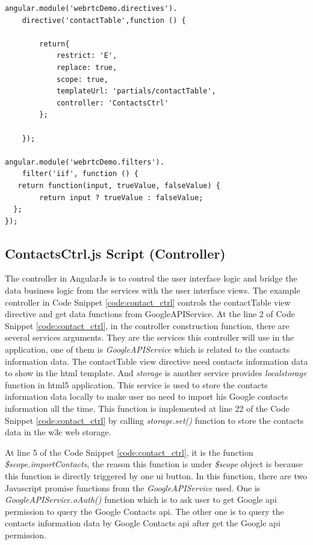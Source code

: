 \begin{lstlisting}[caption={ContactTableDirective.js in application client},label={code:contact_table_dir}]
angular.module('webrtcDemo.directives').
	directive('contactTable',function () {

		return{
			restrict: 'E',
			replace: true,
			scope: true,
			templateUrl: 'partials/contactTable',
			controller: 'ContactsCtrl'
		};

	});

angular.module('webrtcDemo.filters').
	filter('iif', function () {
   return function(input, trueValue, falseValue) {
        return input ? trueValue : falseValue;
  };
});
\end{lstlisting}

\subsection{ContactsCtrl.js Script (Controller)}

\par The controller in AngularJs is to control the user interface logic and bridge the data business logic from the services with the user interface views. The example controller in Code Snippet \ref{code:contact_ctrl} controls the contactTable view directive and get data functions from GoogleAPIService. At the line 2 of Code Snippet \ref{code:contact_ctrl}, in the controller construction function, there are several services arguments. They are the services this controller will use in the application, one of them is \textit{GoogleAPIService} which is related to the contacts information data. The contactTable view directive need contacts information data to show in the \gls{html} template. And \textit{storage} is another service provides \textit{localstorage} function in \gls{html5} application. This service is used to store the contacts information data locally to make user no need to import his Google contacts information all the time. This function is implemented at line 22 of the Code Snippet \ref{code:contact_ctrl} by calling \textit{storage.set()} function to store the contacts data in the \gls{w3c} web storage.

\par At line 5 of the Code Snippet \ref{code:contact_ctrl}, it is the function \textit{\$scope.importContacts}, the reason this function is under \textit{\$scope} object is because this function is directly triggered by one \gls{ui} button. In this function, there are two Javascript promise functions from the \textit{GoogleAPIService} used. One is \textit{GoogleAPIService.oAuth()} function which is to ask user to get Google \gls{api} permission to query the Google Contacts \gls{api}. The other one is  to query the contacts information data by Google Contacts \gls{api} after get the Google \gls{api} permission.

